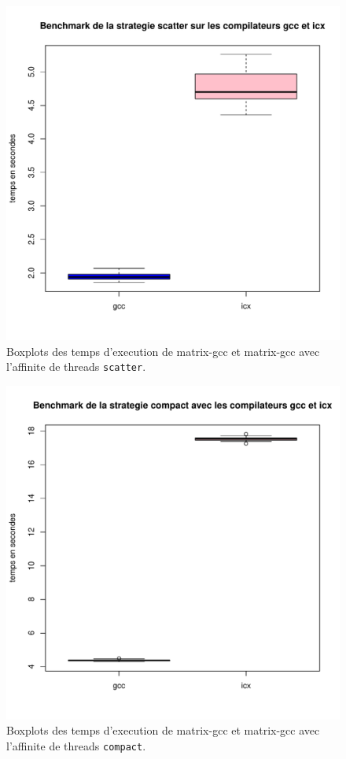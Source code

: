 \documentclass{rapport}
\begin{document}
\begin{figure}[H]
    \centering
    \includegraphics[width=1\textwidth]{../tp3/benchmark/benchmark_scatter.pdf}
    \caption{Boxplots des temps d'execution de matrix-gcc et matrix-gcc avec l'affinite de threads \texttt{scatter}.}
\end{figure}

\begin{figure}[H]
    \centering
    \includegraphics[width=1\textwidth]{../tp3/benchmark/benchmark_compact.pdf}
    \caption{Boxplots des temps d'execution de matrix-gcc et matrix-gcc avec l'affinite de threads \texttt{compact}.}
\end{figure}
\end{document}
